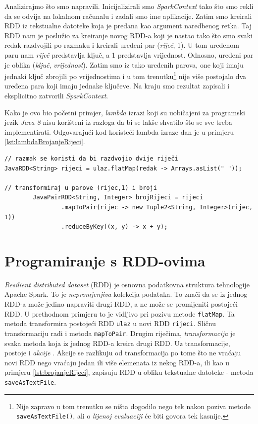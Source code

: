 \documentclass[times, utf8, zavrsni]{fer}
\begin{document}

\vspace{5mm}

Analizirajmo što smo napravili. Inicijalizirali smo \emph{SparkContext} tako što smo rekli da se odvija na lokalnom računalu i zadali smo ime aplikacije. Zatim smo kreirali RDD iz tekstualne datoteke koja je predana kao argument naredbenog retka. Taj RDD nam je poslužio za kreiranje novog RDD-a koji je nastao tako što smo svaki redak razdvojili po razmaku i kreirali uređeni par (\emph{riječ}, 1). U tom uređenom paru nam \emph{riječ} predstavlja ključ, a 1 predstavlja vrijednost. Odnosno, uređeni par je oblika (\emph{ključ}, \emph{vrijednost}). Zatim smo iz tako uređenih parova, one koji imaju jednaki ključ zbrojili po vrijednostima i u tom trenutku\footnote{Nije zapravo u tom trenutku se ništa dogodilo nego tek nakon poziva metode \texttt{saveAsTextFile()}, ali o \emph{lijenoj evaluaciji}  će biti govora tek kasnije.} nije više postojalo dva uređena para koji imaju jednake ključeve. Na kraju smo rezultat zapisali i eksplicitno zatvorili \emph{SparkContext}. 

Kako je ovo bio početni primjer, \emph{lambda} izrazi koji su uobičajeni za programski jezik \emph{Java 8} nisu korišteni iz razloga da bi se lakše shvatilo što se sve treba implementirati. Odgovarajući kod koristeći lambda izraze dan je u primjeru \ref{lst:lambdaBrojanjeRijeci}.
\vspace{5mm}
\begin{lstlisting}[label={lst:lambdaBrojanjeRijeci}]
// razmak se koristi da bi razdvojio dvije riječi
JavaRDD<String> rijeci = ulaz.flatMap(redak -> Arrays.asList(" "));

// transformiraj u parove (rijec,1) i broji
		JavaPairRDD<String, Integer> brojRijeci = rijeci
				.mapToPair(rijec -> new Tuple2<String, Integer>(rijec, 1))
				.reduceByKey((x, y) -> x + y);
\end{lstlisting}
\vspace{5mm}


\section{Programiranje s RDD-ovima}
\emph{Resilient distributed dataset} (RDD) je osnovna podatkovna struktura tehnologije Apache Spark. To je \emph{nepromjenjiva}  kolekcija podataka. To znači da se iz jednog RDD-a može jedino napraviti drugi RDD, a ne može se promijeniti postojeći RDD. U prethodnom primjeru to je vidljivo pri pozivu metode \texttt{flatMap}. Ta metoda transformira postojeći RDD \texttt{ulaz} u novi RDD \texttt{rijeci}. Sličnu transformaciju radi i metoda \texttt{mapToPair}. Drugim riječima, \emph{transformacija}  je svaka metoda koja iz jednog RDD-a kreira drugi RDD. Uz transformacije, postoje i \emph{akcije} . Akcije se razlikuju od transformacija po tome što ne vraćaju novi RDD nego vraćaju jedan ili više elemenata iz nekog RDD-a, ili kao u primjeru \ref{lst:brojanjeRijeci}, zapisuju RDD u obliku tekstualne datoteke - metoda \texttt{saveAsTextFile}.
\end{document}

